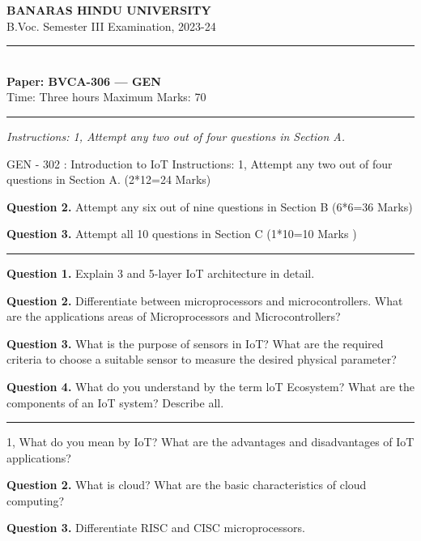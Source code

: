 \documentclass[11pt,a4paper]{article}
\begin{document}
\begin{center}
  {\large\bfseries BANARAS HINDU UNIVERSITY}\\[2pt]
  {\normalsize B.Voc. Semester III Examination, 2023-24}\\[6pt]
  \rule{0.8\linewidth}{0.5pt}\\[6pt]
  {\large\bfseries Paper: BVCA-306 --- GEN}\\[4pt]
  {\normalsize Time: Three hours \hfill Maximum Marks: 70}
\end{center}

\rule{\linewidth}{0.4pt}

\smallskip
\noindent\textit{Instructions: 1, Attempt any two out of four questions in Section A.}

\bigskip

GEN - 302 : Introduction to IoT
Instructions:
1, Attempt any two out of four questions in Section A. (2*12=24 Marks)

\medskip\noindent\textbf{Question 2.} Attempt any six out of nine questions in Section B (6*6=36 Marks)

\medskip\noindent\textbf{Question 3.} Attempt all 10 questions in Section C (1*10=10 Marks )

\bigskip{}
\rule{\linewidth}{0.4pt}\smallskip

\medskip\noindent\textbf{Question 1.} Explain 3 and 5-layer IoT architecture in detail.

\medskip\noindent\textbf{Question 2.} Differentiate between microprocessors and microcontrollers. What are the
applications areas of Microprocessors and Microcontrollers?

\medskip\noindent\textbf{Question 3.} What is the purpose of sensors in IoT? What are the required criteria to choose a
suitable sensor to measure the desired physical parameter?

\medskip\noindent\textbf{Question 4.} What do you understand by the term loT Ecosystem? What are the components
of an IoT system? Describe all.

\bigskip{}
\rule{\linewidth}{0.4pt}\smallskip

1, What do you mean by IoT? What are the advantages and disadvantages of IoT
applications?

\medskip\noindent\textbf{Question 2.} What is cloud? What are the basic characteristics of cloud computing?

\medskip\noindent\textbf{Question 3.} Differentiate RISC and CISC microprocessors.
\end{document}
